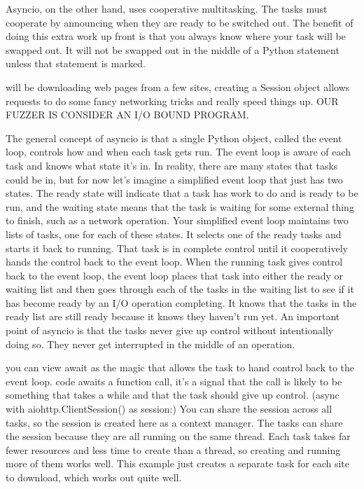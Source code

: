 
Asyncio, on the other hand, uses cooperative multitasking. The tasks must cooperate by announcing when they are ready to be switched out. The benefit of doing this extra work up front is that you always know where your task will be swapped out.
It will not be swapped out in the middle of a Python statement unless that statement is marked. 

will be downloading web pages from a few sites, creating a Session object allows requests to do some fancy networking tricks and really speed things up.
 OUR FUZZER IS CONSIDER AN I/O BOUND PROGRAM.
 
 The general concept of asyncio is that a single Python object, called the event loop, controls how and when each task gets run. The event loop is aware of each task and knows what state it's in. In reality, there are many states that tasks could be in, but for now let's imagine a simplified event loop that just has two states. The ready state will indicate that a task has work to do and is ready to be run, and the waiting state means that the task is waiting for some external thing to finish, such as a network operation. Your simplified event loop maintains two lists of tasks, one for each of these states. It selects one of the ready tasks and starts it back to running. That task is in complete control until it cooperatively hands the control back to the event loop. When the running task gives control back to the event loop, the event loop places that task into either the ready or waiting list and then goes through each of the tasks in the waiting list to see if it has become ready by an I/O operation completing. It knows that the tasks in the ready list are still ready because it knows they haven't run yet. An important point of asyncio is that the tasks never give up control without intentionally doing so. They never get interrupted in the middle of an operation. 
 
 you can view await as the magic that allows the task to hand control back to the event loop.  code awaits a function call, it's a signal that the call is likely to be something that takes a while and that the task should give up control.
(async with aiohttp.ClientSession() as session:) You can share the session across all tasks, so the session is created here as a context manager. The tasks can share the session because they are all running on the same thread. Each task takes far fewer resources and less time to create than a thread, so creating and running more of them works well. This example just creates a separate task for each site to download, which works out quite well.

